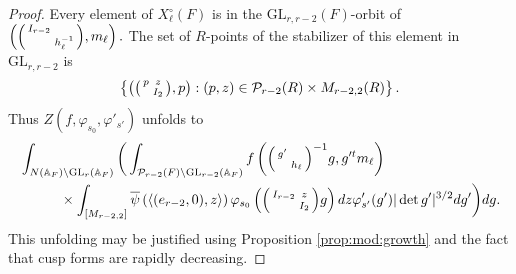 \documentclass[12pt]{amsart}
\theoremstyle{remark}
\numberwithin{equation}{section}
\newcommand{\A}{\mathbb{A}}
\newcommand{\GL}{\mathrm{GL}}
\theoremstyle{definition}
\newenvironment{psmatrix}
  {\left(\begin{smallmatrix}}
  {\end{smallmatrix}\right)}
\numberwithin{equation}{subsection}
\begin{document}
\begin{proof}
Every element of $X_\ell^\circ(F)$ is in the $\GL_{r,r-2}(F)$-orbit of
$
\left(\begin{psmatrix}I_{r-2} & \\ & h_{\ell}^{-1}\end{psmatrix},m_\ell\right).
$
The set of $R$-points of the stabilizer of this element  in $\GL_{r,r-2}$
is
\begin{align*}
    \left\{ \left(\begin{psmatrix} p & z\\ & I_2 \end{psmatrix},p\right):(p,z) \in \mathcal{P}_{r-2}(R) \times M_{r-2,2}(R)\right\}.
\end{align*}
Thus $Z(f,\varphi_{s_0},\varphi'_{s'})$ unfolds to 
\begin{align} \label{before:Whitt} \begin{split}
    &\int_{N(\A_F) \backslash \GL_r(\A_F)}\bigg(\int_{\mathcal{P}_{r-2}(F) \backslash \GL_{r-2}(\A_F)} 
 f\left(\begin{psmatrix} g' & \\ & h_{\ell} \end{psmatrix}^{-1}g,g'^{t}m_\ell\right) \\ &\hspace{0.4in}\times  \int_{[M_{r-2,2}]}\overline{\psi}\left(\langle (e_{r-2},0),z \rangle \right)\varphi_{s_0}\left(\begin{psmatrix} I_{r-2} & z\\ & I_2 \end{psmatrix}g\right)dz \varphi'_{s'}(g')|\det g'|^{3/2}dg'\bigg)dg.
 \end{split}
\end{align}
This unfolding may be justified using Proposition \ref{prop:mod:growth} and the fact that cusp forms are rapidly decreasing.  


\end{proof}
\end{document}
